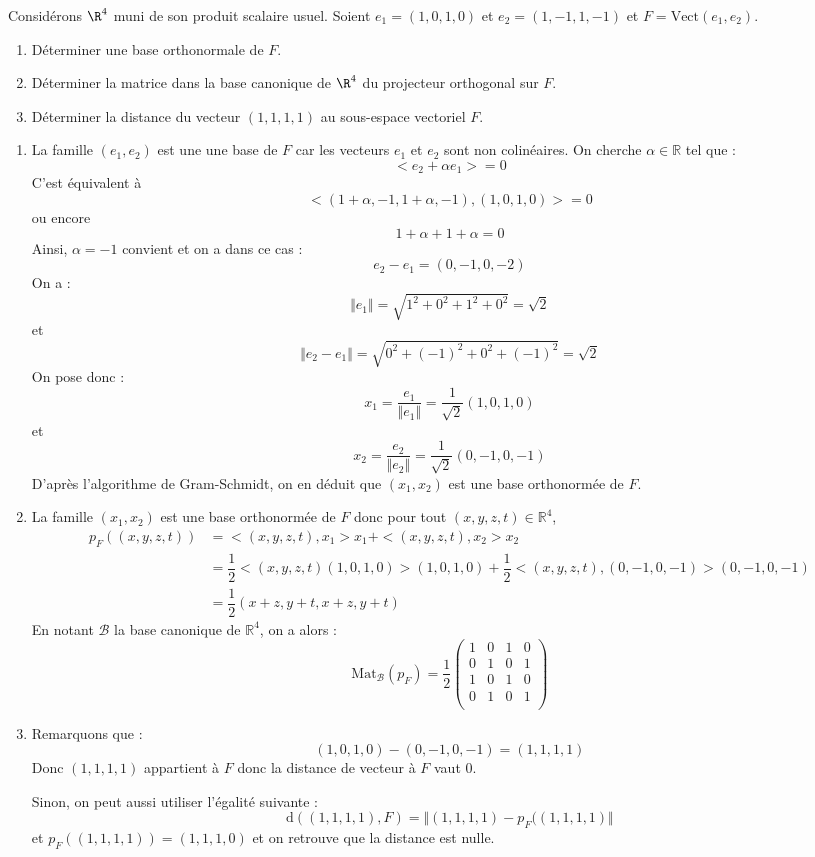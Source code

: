 \documentclass[a4paper,10pt]{report}
\begin{document}
\begin{Exa} Considérons $\R^4$ muni de son produit scalaire usuel. Soient $e_1=(1,0,1,0)$ et $e_2=(1,-1,1,-1)$ et $F=\textrm{Vect}(e_1,e_2)$.
\begin{enumerate}
    \item  D\'eterminer une base orthonormale de $F.$
    \item  D\'eterminer la matrice dans la base canonique de $\R^4$ du projecteur orthogonal
sur $F.$
    \item  D\'eterminer la distance du vecteur $(1,1,1,1)$ au sous-espace vectoriel  $F.$
\end{enumerate}
\end{Exa}

\corr 

\begin{enumerate}
\item La famille $(e_1,e_2)$ est une une base de $F$ car les vecteurs $e_1$ et $e_2$ sont non colinéaires. On cherche $\alpha \in \mathbb{R}$ tel que :
$$ <e_2+ \alpha e_1>= 0$$
C'est équivalent à 
$$ <(1+ \alpha,-1,1+ \alpha,-1),(1,0,1,0)>=0$$
ou encore 
$$ 1+ \alpha + 1 +  \alpha = 0$$
Ainsi, $\alpha=-1$ convient et on a dans ce cas :
$$ e_2-e_1 = (0,-1,0,-2)$$
On a :
$$ \Vert e_1 \Vert = \sqrt{1^2+0^2+1^2+0^2}= \sqrt{2}$$
et 
$$ \Vert e_2-e_1 \Vert = \sqrt{0^2+(-1)^2+0^2+(-1)^2} = \sqrt{2}$$
On pose donc :
$$ x_1 = \dfrac{e_1}{\Vert e_1 \Vert} = \dfrac{1}{\sqrt{2}} (1,0,1,0)$$
et 
$$ x_2 = \dfrac{e_2}{\Vert e_2 \Vert}  = \dfrac{1}{\sqrt{2}}(0,-1,0,-1)$$
D'après l'algorithme de Gram-Schmidt, on en déduit que $(x_1,x_2)$ est une base orthonormée de $F$.
\item La famille $(x_1,x_2)$ est une base orthonormée de $F$ donc pour tout $(x,y,z,t) \in \mathbb{R}^4$,
\begin{align*}
p_F((x,y,z,t)) & = <(x,y,z,t),x_1>x_1 + <(x,y,z,t),x_2>x_2 \\
& = \dfrac{1}{2} <(x,y,z,t)(1,0,1,0)>(1,0,1,0) + \dfrac{1}{2} <(x,y,z,t),(0,-1,0,-1)>(0,-1,0,-1) \\
& = \dfrac{1}{2} (x+z,y+t ,x+z, y+t)
\end{align*}
En notant $\mathcal{B}$ la base canonique de $\mathbb{R}^4$, on a alors :
$$ \textrm{Mat}_{\mathcal{B}}(p_F) =\dfrac{1}{2} \begin{pmatrix}
1 & 0 & 1 & 0 \\
0 & 1  &  0 & 1 \\
1 & 0& 1 & 0\\
0& 1 &  0 & 1\\
\end{pmatrix}$$
\item Remarquons que :
$$ (1,0,1,0)-(0,-1,0,-1) = (1,1,1,1)$$
Donc $(1,1,1,1)$ appartient à $F$ donc la distance de vecteur à $F$ vaut $0$.

\medskip

\noindent Sinon, on peut aussi utiliser l'égalité suivante :
$$ \textrm{d}((1,1,1,1),F) = \Vert (1,1,1,1)-p_F((1,1,1,1) \Vert$$
et $p_F((1,1,1,1))=(1,1,1,0)$ et on retrouve que la distance est nulle.
\end{enumerate}
\end{document}
